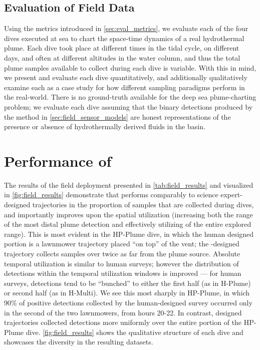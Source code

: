 \subsection{Evaluation of Field Data}
\label{sec:field_eval_metrics}
Using the metrics introduced in \cref{sec:eval_metrics}, we evaluate each of the four dives executed at sea to chart the space-time dynamics of a real hydrothermal plume. Each dive took place at different times in the tidal cycle, on different days, and often at different altitudes in the water column, and thus the total plume samples available to collect during each dive is variable. With this in mind, we present and evaluate each dive quantitatively, and additionally qualitatively examine each as a case study for how different sampling paradigms perform in the real-world. There is no ground-truth available for the deep sea plume-charting problem; we evaluate each \Sentry dive assuming that the binary detections produced by the method in \cref{sec:field_sensor_models} are honest representations of the presence or absence of hydrothermally derived fluids in the basin. 

\section{Performance of \PHORTEX}
\label{sec:phortex_performance}
The results of the field deployment presented in \cref{tab:field_results} and visualized in \cref{fig:field_results} demonstrate that \PHORTEX performs comparably to science expert-designed trajectories in the proportion of samples that are collected during dives, and importantly improves upon the spatial utilization (increasing both the range of the most distal plume detection and effectively utilizing of the entire explored range). This is most evident in the HP-Plume dive, in which the human designed portion is a lawnmower trajectory placed ``on top'' of the vent; the \PHORTEX-designed trajectory collects samples over twice as far from the plume source. Absolute temporal utilization is similar to human surveys; however the distribution of detections within the temporal utilization windows is improved --- for human surveys, detections tend to be ``bunched'' to either the first half (as in H-Plume) or second half (as in H-Multi). We see this most sharply in HP-Plume, in which 90\% of positive detections collected by the human-designed survey occurred only in the second of the two lawnmowers, from hours 20-22. In contrast, \PHORTEX designed trajectories collected detections more uniformly over the entire \PHORTEX portion of the HP-Plume dive. \cref{fig:field_results} shows the qualitative structure of each dive and showcases the diversity in the resulting datasets.

